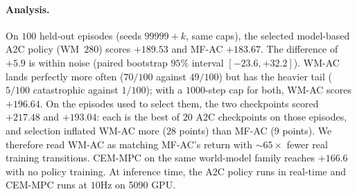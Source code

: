 \documentclass[11pt]{article}
\theoremstyle{remark}
\begin{document}
\begin{table}[htbp]
\centering
\small
\setlength{\tabcolsep}{4pt}
\caption{MPC vs world-model-based AC policy vs model-free AC policy training complexity and closed-loop returns in real environment. Model-free AC policy (MF-AC) is the most expensive to train data-wise (needs $65.3\times$ more data provided as sim interactions). WM-AC matches MF-AC's return despite using only the offline dataset. Checkpoint evaluation of the A2C policies themselves is excluded on both sides. All rows use $100$ deterministic episodes. The two A2C rows are scored on held-out episodes (seeds $99999{+}k$) that were not used to choose their checkpoints; on the selection episodes (seeds $12345{+}k$) they scored $+217.48$ and $+193.04$. MPC uses seeds $12345{+}k$; its checkpoint was chosen from a $20$-episode sweep on the first $20$ of these. MPC and WM-AC use a $600$-step cap; MF-AC uses the standard $1000$-step horizon. \textbf{Perfect} $=$ return $>+200$ (as in the evaluation code); \textbf{Catast.}\ $=$ return $<-100$.}
\label{tab:data-efficiency}
\end{table}

\paragraph{Analysis.}
On $100$ held-out episodes (seeds $99999{+}k$, same caps), the selected model-based A2C policy (WM~$280$) scores $+189.53$ and MF-AC $+183.67$. The difference of $+5.9$ is within noise (paired bootstrap $95\%$ interval $[-23.6, +32.2]$). WM-AC lands perfectly more often ($70/100$ against $49/100$) but has the heavier tail ($5/100$ catastrophic against $1/100$); with a $1000$-step cap for both, WM-AC scores $+196.64$. On the episodes used to select them, the two checkpoints scored $+217.48$ and $+193.04$: each is the best of $20$ A2C checkpoints on those episodes, and selection inflated WM-AC more ($28$ points) than MF-AC ($9$ points). We therefore read WM-AC as matching MF-AC's return with ${\sim}65\times$ fewer real training transitions. CEM-MPC on the same world-model family reaches $+166.6$ with no policy training. At inference time, the A2C policy runs in real-time and CEM-MPC runs at $10$Hz on 5090 GPU.
\end{document}

